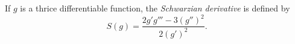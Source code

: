 \documentclass[12pt]{article}
\begin{document}
If $g$ is a thrice differentiable function, the \emph{Schwarzian derivative}
 is defined by $$S(g)=\frac{2g'g'''-3(g'')^2}{2(g')^2}.$$
\end{document}
